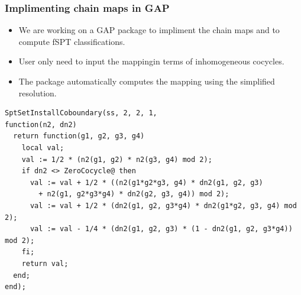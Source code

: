 \documentclass[xcolor=table, 11pt, aspectratio=1610]{beamer}
\begin{document}
\begin{frame}[fragile]
	\frametitle{Implimenting chain maps in GAP}
	\begin{itemize}
		\item We are working on a GAP package to impliment the chain maps and to compute fSPT classifications.
		\item User only need to input the mappingin terms of inhomogeneous cocycles.
		\item The package automatically computes the mapping using the simplified resolution.
	\end{itemize}
\begin{lstlisting}[basicstyle=\footnotesize,morekeywords={function,return,local,if,fi,then,end},showspaces=false,showtabs=false, keywordstyle=\color{blue}]
SptSetInstallCoboundary(ss, 2, 2, 1,
function(n2, dn2)
  return function(g1, g2, g3, g4)
    local val;
    val := 1/2 * (n2(g1, g2) * n2(g3, g4) mod 2);
    if dn2 <> ZeroCocycle@ then
      val := val + 1/2 * ((n2(g1*g2*g3, g4) * dn2(g1, g2, g3)
        + n2(g1, g2*g3*g4) * dn2(g2, g3, g4)) mod 2);
      val := val + 1/2 * (dn2(g1, g2, g3*g4) * dn2(g1*g2, g3, g4) mod 2);
      val := val - 1/4 * (dn2(g1, g2, g3) * (1 - dn2(g1, g2, g3*g4)) mod 2);
    fi;
    return val;
  end;
end);
\end{lstlisting}
\end{frame}
\end{document}

